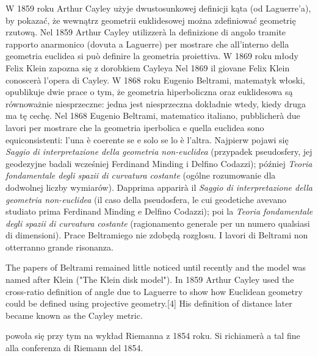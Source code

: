 W 1859 roku Arthur Cayley użyje dwustosunkowej definicji kąta (od Laguerre'a), by pokazać, że wewnątrz geometrii euklidesowej można zdefiniować geometrię rzutową. %
Nel 1859 Arthur Cayley utilizzerà la definizione di angolo tramite rapporto anarmonico (dovuta a Laguerre) per mostrare che all'interno della geometria euclidea si può definire la geometria proiettiva. %
W 1869 roku młody Felix Klein zapozna się z dorobkiem Cayleya %
Nel 1869 il giovane Felix Klein conoscerà l'opera di Cayley. %
W 1868 roku Eugenio Beltrami, matematyk włoski, opublikuje dwie prace o tym, że geometria hiperboliczna oraz euklidesowa są równoważnie niesprzeczne: jedna jest niesprzeczna dokładnie wtedy, kiedy druga ma tę cechę. %
Nel 1868 Eugenio Beltrami, matematico italiano, pubblicherà due lavori per mostrare che la geometria iperbolica e quella euclidea sono equiconsistenti: l'una è coerente se e solo se lo è l'altra. %
Najpierw pojawi się \emph{Saggio di interpretazione della geometria non-euclidea} (przypadek pseudosfery, jej geodezyjne badali wcześniej Ferdinand Minding i Delfino Codazzi); później \emph{Teoria fondamentale degli spazii di curvatura costante} (ogólne rozumowanie dla dodwolnej liczby wymiarów). %
Dapprima apparirà il \emph{Saggio di interpretazione della geometria non-euclidea} (il caso della pseudosfera, le cui geodetiche avevano studiato prima Ferdinand Minding e Delfino Codazzi); poi la \emph{Teoria fondamentale degli spazii di curvatura costante} (ragionamento generale per un numero qualsiasi di dimensioni). %
Prace Beltramiego nie zdobędą rozgłosu. %
I lavori di Beltrami non otterranno grande risonanza. %



The papers of Beltrami remained little noticed until recently and the model was named after Klein ("The Klein disk model"). In 1859 Arthur Cayley used the cross-ratio definition of angle due to Laguerre to show how Euclidean geometry could be defined using projective geometry.[4] His definition of distance later became known as the Cayley metric.



powoła się przy tym na wykład Riemanna z 1854 roku. %
Si richiamerà a tal fine alla conferenza di Riemann del 1854. %
%
%
%

